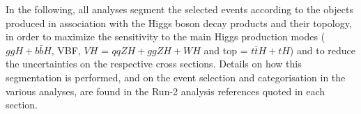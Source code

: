 In the following, all analyses segment the selected events according to the objects produced in association with the Higgs boson decay products and their topology, in order to maximize the sensitivity to the main Higgs production modes ($ggH+b\bar{b}H$, VBF, $VH$ = $qqZH+ggZH+WH$ and top = $t\bar{t}H+tH$)  and to reduce the uncertainties on the respective cross sections. Details on how this segmentation is performed, and on the event selection and categorisation in the various analyses, are found in the Run-2 analysis references quoted in each section.